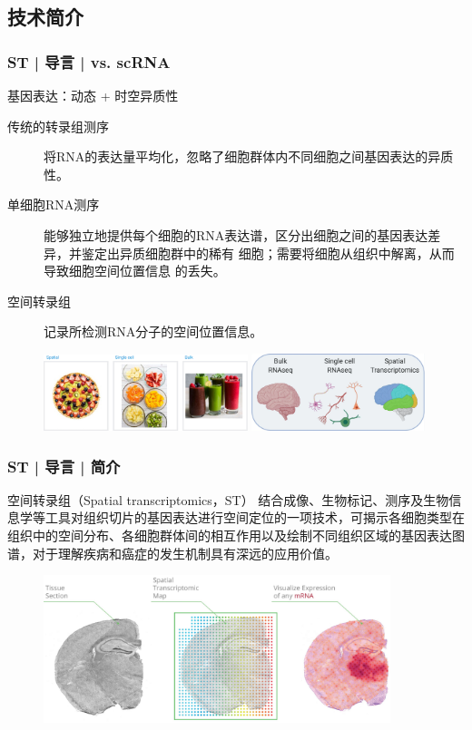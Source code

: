 \documentclass[11pt]{ctexbeamer}
\begin{document}
\subsection{技术简介}
\begin{frame}
	\frametitle{ST | 导言 | vs. scRNA}
	\begin{block}{基因表达：动态 + 时空异质性}
		\begin{description}
			\item[传统的转录组测序] 将RNA的表达量平均化，忽略了细胞群体内不同细胞之间基因表达的异质性。
			\item[单细胞RNA测序] 能够独立地提供每个细胞的RNA表达谱，区分出细胞之间的基因表达差异，并鉴定出异质细胞群中的稀有
			细胞；需要将细胞从组织中解离，从而导致细胞空间位置信息
			的丢失。
			\item[空间转录组]  记录所检测RNA分子的空间位置信息。
		\end{description}
	\end{block}
	\begin{figure}
		\includegraphics[width=0.53\textwidth]{ST_vs_scRNA_04.png}
		\includegraphics[width=0.45\textwidth]{ST_vs_scRNA_07.png}
	\end{figure}
\end{frame}

\begin{frame}
    \frametitle{ST | 导言 | 简介}
    \begin{block}{\alert{空间转录组（Spatial transcriptomics，ST）}}
    	结合成像、生物标记、测序及生物信息学等工具对组织切片的基因表达进行空间定位的一项技术，可揭示各细胞类型在组织中的空间分布、各细胞群体间的相互作用以及绘制不同组织区域的基因表达图谱，对于理解疾病和癌症的发生机制具有深远的应用价值。
    \end{block}
	\begin{figure}
	\includegraphics[width=0.9\textwidth]{ST_intro_02.png}
\end{figure}
\end{frame}
\end{document}
